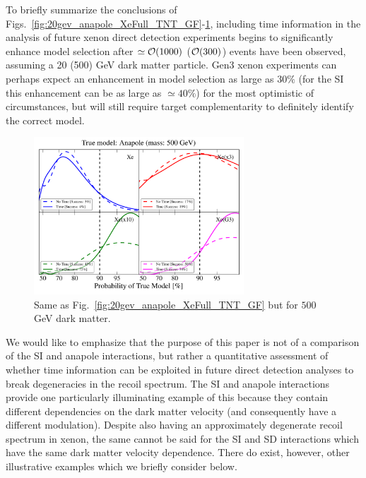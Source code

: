 \documentclass[11pt]{article}
\begin{document}
To briefly summarize the conclusions of Figs.~\ref{fig:20gev_anapole_XeFull_TNT_GF}-\ref{fig:500gev_anapole_XeFull_TNT_GF}, including time information in the analysis of future xenon direct detection experiments begins to significantly enhance model selection after $\simeq {\cal O}(1000)$ ($ {\cal O}(300)$) events have been observed, assuming a 20 (500) GeV dark matter particle. Gen3 xenon experiments can perhaps expect an enhancement in model selection as large as $30\%$ (for the SI this enhancement can be as large as $\simeq 40\%$) for the most optimistic of circumstances, but will still require target complementarity to definitely identify the correct model.  

\begin{figure}
\centering
\includegraphics[width=0.7\textwidth]{plots/PDF_500GeV_Anapole_50sims_Xe_Xe3x_Xe10x_XeG3_GF_TNT.pdf}
\caption{\label{fig:500gev_anapole_XeFull_TNT_GF}
Same as Fig.~\ref{fig:20gev_anapole_XeFull_TNT_GF} but for $500$ GeV dark matter.}
\end{figure}

We would like to emphasize that the purpose of this paper is not of a comparison of the SI and anapole interactions, but rather a quantitative assessment of whether time information can be exploited in future direct detection analyses to break degeneracies in the recoil spectrum. The SI and anapole interactions provide one particularly illuminating example of this because they contain different dependencies on the dark matter velocity (and consequently have a different modulation). Despite also having an approximately degenerate recoil spectrum in xenon, the same cannot be said for the SI and SD interactions which have the same dark matter velocity dependence. There do exist, however, other illustrative examples which we briefly consider below.
\end{document}
